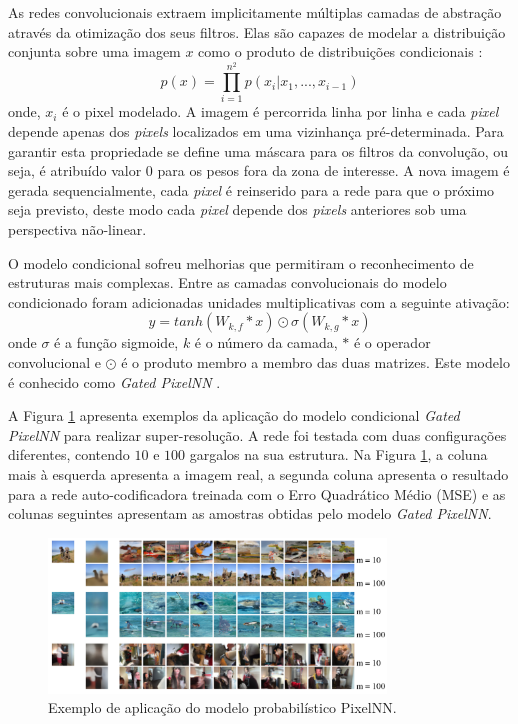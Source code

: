 As redes convolucionais extraem implicitamente
múltiplas camadas de abstração através da otimização dos seus filtros.
Elas são capazes de modelar a distribuição conjunta sobre
uma imagem $x$ como o produto de distribuições condicionais \citep{Oord16}:
\begin{equation}
\label{eqn:prodcnn}
p(x) = \prod_{i=1}^{n^2}p(x_i|x_1,...,x_{i-1})
\end{equation}
onde, $x_i$ é o pixel modelado. A imagem é percorrida linha por linha e cada
\textit{pixel} depende apenas dos \textit{pixels} localizados em uma vizinhança pré-determinada.
Para garantir esta propriedade se define uma máscara para os filtros da convolução,
ou seja, é atribuído valor $0$ para os pesos fora da zona de interesse.
A nova imagem é gerada sequencialmente, cada \textit{pixel} é reinserido para a rede para que o próximo seja previsto,
deste modo cada \textit{pixel} depende dos \textit{pixels} anteriores
sob uma perspectiva não-linear.

O modelo condicional sofreu melhorias que permitiram o reconhecimento de estruturas mais complexas.
Entre as camadas convolucionais do modelo condicionado foram adicionadas unidades
multiplicativas com a seguinte ativação:
\begin{equation}
\label{eqn:actvcnn}
y = tanh(W_{k,f} * x)\odot \sigma(W_{k,g}*x)
\end{equation}
onde $\sigma$ é a função sigmoide, $k$ é o número da camada, $*$ é o operador
convolucional e $\odot$ é o produto membro a membro das duas matrizes. Este modelo é
conhecido como \textit{Gated PixelNN} \citep{Oord16}.

A Figura \ref{fig:example2} apresenta exemplos da aplicação do modelo condicional \textit{Gated PixelNN}
para realizar super-resolução.
A rede foi testada com duas configurações diferentes, contendo $10$ e $100$ gargalos na sua estrutura.
Na Figura \ref{fig:example2}, a coluna mais à esquerda apresenta a imagem real, a segunda coluna apresenta
o resultado para a rede auto-codificadora treinada com o Erro Quadrático Médio (MSE) e as
colunas seguintes apresentam as amostras obtidas pelo modelo \textit{Gated PixelNN}.
\begin{figure}[ht!]
\begin{center}
  \includegraphics[width=0.8\textwidth]{fig/example_superres_2}
  \caption{Exemplo de aplicação do modelo probabilístico PixelNN. \citep{Oord16}}
  \label{fig:example2}
\end{center}
\end{figure}

